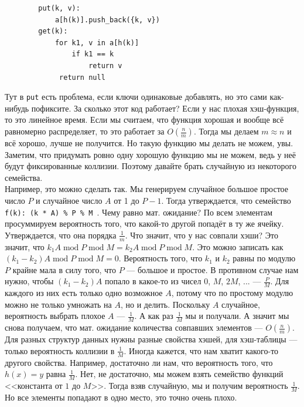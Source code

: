 \documentclass{article}
\newcommand{\pseudo}{PseudoLexer.py:PseudoLexer -x}
\newcommand{\pseudocode}[1]{\texttt{#1}}
\begin{document}
    \begin{verbatim}
        put(k, v):
            a[h(k)].push_back({k, v})
        get(k):
            for k1, v in a[h(k)]
                if k1 == k
                    return v
             return null
    \end{verbatim}
    Тут в \pseudocode{put} есть проблема, если ключи одинаковые добавлять, но это сами как-нибудь пофиксите. За сколько этот код работает? Если у нас плохая хэш-функция, то это линейное время. Если мы считаем, что функция хорошая и вообще всё равномерно распределяет, то это работает за $O(\frac nm)$. Тогда мы делаем $m\approx n$ и всё хорошо, лучше не получится. Но такую функцию мы делать не можем, увы. Заметим, что придумать ровно одну хорошую функцию мы не можем, ведь у неё будут фиксированные коллизии. Поэтому давайте брать случайную из некоторого семейства.\\
    Например, это можно сделать так. Мы генерируем случайное большое простое число $P$ и случайное число $A$ от 1 до $P-1$. Тогда утверждается, что семейство \pseudocode{f(k): (k * A) \% P \% M
    }.
    Чему равно мат. ожидание? По всем элементам просуммируем вероятность того, что какой-то другой попадёт в ту же ячейку. Утверждается, что она порядка $\frac1m$. Что значит, что у нас совпали хэши? Это значит, что $k_1A\operatorname{mod}P\operatorname{mod}M=k_2A\operatorname{mod}P\operatorname{mod}M$. Это можно записать как $(k_1-k_2)A\operatorname{mod}P\operatorname{mod}M=0$. Вероятность того, что $k_1$ и $k_2$ равны по модулю $P$ крайне мала в силу того, что $P$ --- большое и простое. В противном случае нам нужно, чтобы $(k_1-k_2)A$ попало в какое-то из чисел $0$, $M$, $2M$, ... --- $\frac PM$. Для каждого из них есть только одно возможное $A$, потому что по простому модулю можно не только умножать на $A$, но и делить. Поскольку $A$ случайное, вероятность выбрать плохое $A$ --- $\frac1M$. А как раз $\frac1M$ мы и получали. А значит мы снова получаем, что мат. ожидание количества совпавших элементов --- $O(\frac nm)$.\\
    Для разных структур данных нужны разные свойства хэшей, для хэш-таблицы --- только вероятность коллизии в $\frac1M$. Иногда кажется, что нам хватит какого-то другого свойства. Например, достаточно ли нам, что вероятность того, что $h(x)=y$ равна $\frac1M$. Нет, не достаточно, мы можем взять семейство функций <<константа от $1$ до $M$>>. Тогда взяв случайную, мы и получим вероятность $\frac1M$. Но все элементы попадают в одно место, это точно очень плохо.\\
\end{document}
